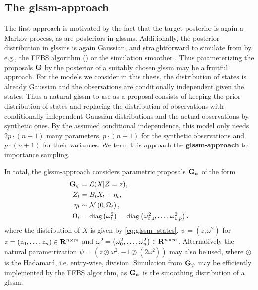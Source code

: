 \subsection{\texorpdfstring{The \gls{glssm}-approach}{The GLSSM-approach}}
\label{subsec:glssm-approach}
The first approach is motivated by the fact that the target posterior is again a Markov process, as are posteriors in \glspl{glssm}. Additionally, the posterior distribution in \gls{glssm}s is again Gaussian, and straightforward to simulate from by, e.g., the FFBS algorithm () or the simulation smoother \citep{Durbin2002Simple}. Thus parameterizing the proposals $\mathbf G$ by the posterior of a suitably chosen \gls{glssm} may be a fruitful approach.
For the models we consider in this thesis, the distribution of states is already Gaussian and the observations are conditionally independent given the states. Thus a natural \gls{glssm} to use as a proposal consists of keeping the prior distribution of states and replacing the distribution of observations with conditionally independent Gaussian distributions and the actual observations by synthetic ones. By the assumed conditional independence, this model only needs $2 p\cdot (n + 1)$ many parameters, $p\cdot (n + 1)$ for the synthetic observations and $p\cdot (n + 1)$ for their variances. We term this approach the \textbf{\gls{glssm}-approach} to importance sampling.

In total, the \gls{glssm}-approach considers parametric proposals $\mathbf G_{\psi}$ of the form
\begin{align}
    \begin{split}
    \label{eq:glssm-proposal}
    \mathbf G_{\psi} &= \mathcal L(X | Z = z),\\
    Z_{t} &= B_{t} X_{t} + \eta_{t},\\
    \eta_{t} &\sim \mathcal N \left( 0, \Omega_{t} \right),\\
    \Omega_{t} &= \operatorname{diag} \left( \omega^{2}_{t} \right) = \operatorname{diag} \left( \omega^{2}_{t,1}, \dots, \omega^{2}_{1,p} \right).
    \end{split}
\end{align}
where the distribution of $X$ is given by \eqref{eq:glssm_states}, $\psi = \left( z, \omega^{2} \right)$ for $z = \left( z_{0}, \dots, z_{n} \right) \in \mathbf R^{n \times m}$ and $\omega^{2} = \left( \omega^{2}_{0}, \dots, \omega^{2}_{n} \right) \in \mathbf R^{n \times m}$. Alternatively the natural parametrization $\psi = \left( z \oslash \omega^{2}, - 1 \oslash \left( 2 \omega^{2} \right) \right)$ may also be used, where $\oslash$ is the Hadamard, i.e. entry-wise, division. Simulation from $\mathbf G_{\psi}$ may be efficiently implemented by the FFBS algorithm, as $\mathbf G_{\psi}$ is the smoothing distribution of a \gls{glssm}. 

